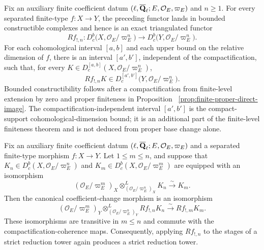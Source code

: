 
\begin{proposition}
\label{prop:finite-compact-support-constructibility}


Fix an auxiliary finite coefficient datum
\((\ell,\overline{\mathbf Q}_\ell;E,\mathcal O_E,\varpi_E)\) and \(n\geq1\).  For every
separated finite-type \(f:X\to Y\), the preceding functor lands
in bounded constructible complexes and hence is an exact triangulated
functor
\[
 Rf_{!,n}:D^b_c\bigl(X,\mathcal O_E/\varpi_E^n\bigr)
 \longrightarrow D^b_c\bigl(Y,\mathcal O_E/\varpi_E^n\bigr).
\]
For each cohomological interval \([a,b]\) and each upper bound on the
relative dimension of \(f\), there is an interval \([a',b']\), independent
of the compactification, such that, for every
\(K\in D_c^{[a,b]}(X,\mathcal O_E/\varpi_E^n)\),
\[
 Rf_{!,n}K\in
 D_c^{[a',b']}\bigl(Y,\mathcal O_E/\varpi_E^n\bigr).
\]
Bounded constructibility follows after a compactification from finite-level
extension by zero and proper finiteness in Proposition
~\ref{prop:finite-proper-direct-image}.  The compactification-independent
interval \([a',b']\) is the compact-support cohomological-dimension bound; it
is an additional part of the finite-level finiteness theorem and is not
deduced from proper base change alone.
\end{proposition}


\begin{proposition}
\label{prop:finite-compact-support-coefficient-change}


Fix an auxiliary finite coefficient datum
\((\ell,\overline{\mathbf Q}_\ell;E,\mathcal O_E,\varpi_E)\) and a separated finite-type
morphism \(f:X\to Y\).  Let \(1\leq m\leq n\), and suppose that
\(K_n\in D^b_c(X,\mathcal O_E/\varpi_E^n)\) and
\(K_m\in D^b_c(X,\mathcal O_E/\varpi_E^m)\) are equipped with an
isomorphism
\[
 (\mathcal O_E/\varpi_E^m)_X
 \otimes^L_{(\mathcal O_E/\varpi_E^n)_X}K_n
 \xrightarrow{\sim}K_m.
\]
Then the canonical coefficient-change morphism is an isomorphism
\[
 (\mathcal O_E/\varpi_E^m)_Y
 \otimes^L_{(\mathcal O_E/\varpi_E^n)_Y}Rf_{!,n}K_n
 \xrightarrow{\sim}Rf_{!,m}K_m.
\]
These isomorphisms are transitive in \(m\leq n\) and commute with the
compactification-coherence maps.  Consequently, applying \(Rf_{!,n}\) to
the stages of a strict reduction tower again produces a strict reduction
tower.
\end{proposition}

